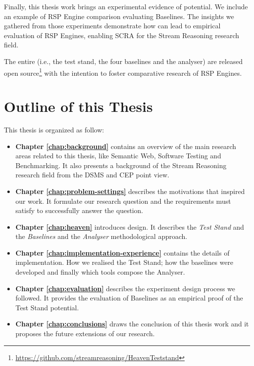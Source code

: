 Finally, this thesis work brings an experimental evidence of \name potential. We include an example of RSP Engine comparison evaluating \name Baselines. %
The insights we gathered from those experiments demonstrate how \name can lead to empirical evaluation of RSP Engines, enabling SCRA for the Stream Reasoning research field.

The entire \name (i.e., the test stand, the four baselines and the analyser) are released open source\footnote{\url{https://github.com/streamreasoning/HeavenTeststand}} with the intention to foster comparative research of RSP Engines.

\section{Outline of this Thesis}\label{sec:thesis-structure-intro}

This thesis is organized as follow:

\begin{itemize}

\item \textbf{Chapter \ref{chap:background}} contains an overview of the main research areas related to this thesis, like Semantic Web, Software Testing and Benchmarking. It also presents a background of the Stream Reasoning research field from the DSMS and CEP point view.
\item \textbf{Chapter \ref{chap:problem-settings}} describes the motivations that inspired our work. It formulate our research question and the requirements \name must satisfy to successfully answer the question.
\item \textbf{Chapter \ref{chap:heaven}} introduces \name design. It describes the \textit{Test Stand} and the \textit{Baselines} and the \textit{Analyser} methodological approach.
\item \textbf{Chapter \ref{chap:implementation-experience}} contains the details of \name implementation. How we realised the Test Stand; how the baselines were developed and finally which tools compose the Analyser.
\item \textbf{Chapter \ref{chap:evaluation}} describes the experiment design process we followed. It provides the evaluation of \name Baselines as an empirical proof of the Test Stand potential.
\item \textbf{Chapter \ref{chap:conclusions}} draws the conclusion of this thesis work and it proposes the future extensions of our research.
\end{itemize}